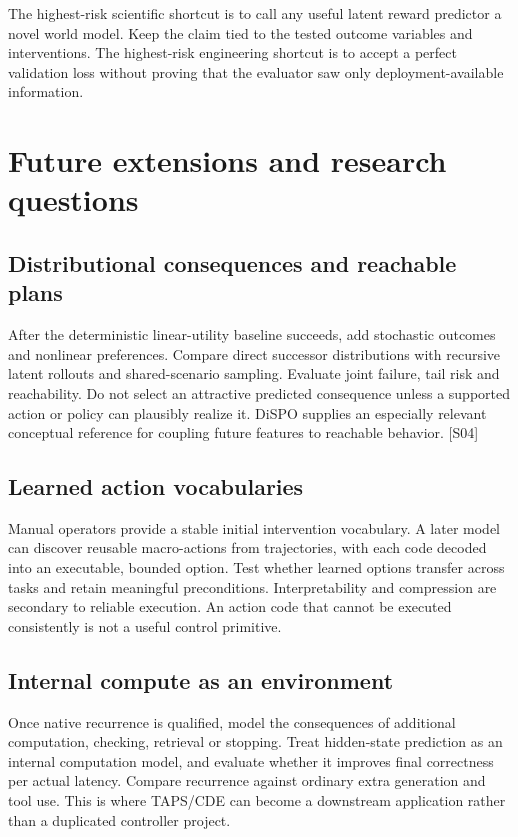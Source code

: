 \documentclass[
  11pt,
  a4paper,
]{article}
\begin{document}
The highest-risk scientific shortcut is to call any useful latent reward
predictor a novel world model. Keep the claim tied to the tested outcome
variables and interventions. The highest-risk engineering shortcut is to
accept a perfect validation loss without proving that the evaluator saw
only deployment-available information.

\section{Future extensions and research
questions}\label{future-extensions-and-research-questions}

\subsection{Distributional consequences and reachable
plans}\label{distributional-consequences-and-reachable-plans}

After the deterministic linear-utility baseline succeeds, add stochastic
outcomes and nonlinear preferences. Compare direct successor
distributions with recursive latent rollouts and shared-scenario
sampling. Evaluate joint failure, tail risk and reachability. Do not
select an attractive predicted consequence unless a supported action or
policy can plausibly realize it. DiSPO supplies an especially relevant
conceptual reference for coupling future features to reachable behavior.
{[}S04{]}

\subsection{Learned action
vocabularies}\label{learned-action-vocabularies}

Manual operators provide a stable initial intervention vocabulary. A
later model can discover reusable macro-actions from trajectories, with
each code decoded into an executable, bounded option. Test whether
learned options transfer across tasks and retain meaningful
preconditions. Interpretability and compression are secondary to
reliable execution. An action code that cannot be executed consistently
is not a useful control primitive.

\subsection{Internal compute as an
environment}\label{internal-compute-as-an-environment}

Once native recurrence is qualified, model the consequences of
additional computation, checking, retrieval or stopping. Treat
hidden-state prediction as an internal computation model, and evaluate
whether it improves final correctness per actual latency. Compare
recurrence against ordinary extra generation and tool use. This is where
TAPS/CDE can become a downstream application rather than a duplicated
controller project.
\end{document}
